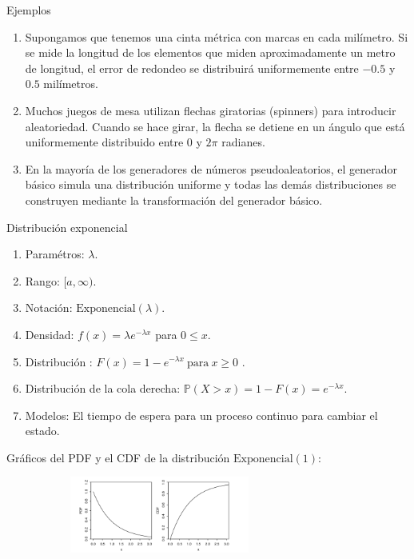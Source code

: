 \documentclass[10pt]{beamer}
\begin{document}
\begin{frame}{Ejemplos}
\small{
\begin{enumerate}
\item Supongamos que tenemos una cinta m\'etrica con marcas en cada mil\'imetro. Si se mide  la longitud de los elementos que miden aproximadamente un metro de longitud, el error de redondeo se distribuir\'a uniformemente entre $-0.5$ y $0.5$ mil\'imetros.

\item Muchos juegos de mesa utilizan flechas giratorias (spinners) para introducir aleatoriedad. Cuando se hace girar, la flecha se detiene en un \'angulo que est\'a uniformemente distribuido entre $0$ y $2\pi$ radianes.

\item En la mayor\'ia de los generadores de n\'umeros pseudoaleatorios, el generador b\'asico simula una distribuci\'on uniforme y todas las dem\'as distribuciones se construyen mediante la transformaci\'on del generador b\'asico.
\end{enumerate}

\vspace{1.5cm}

}
\end{frame}

\begin{frame}{Distribuci\'on exponencial}
\small{
\begin{enumerate}
\item Param\'etros: $\lambda$.
\item Rango: $[a, \infty )$.
\item Notaci\'on: $\text{Exponencial}(\lambda)$.
\item Densidad: $f(x) = \lambda e^{-\lambda x}$ para $0\leq x$.
\item Distribuci\'on : $F(x) = 1 - e^{-\lambda x} \  \text{para}\  x \geq 0$ .
\item Distribuci\'on de la cola derecha: $\mathbb{P}(X > x) = 1 - F(x) = e^{-\lambda x}$.
\item Modelos: El tiempo de espera para un proceso continuo para cambiar el estado.	
\end{enumerate}

Gr\'aficos del PDF y el CDF de la distribuci\'on  $\text{Exponencial}(1)$:

\begin{figure}[ht]
	\centering
	\includegraphics[height=2.5cm, width=8cm]{R2.png}
\end{figure}	
}
\end{frame}
\end{document}

